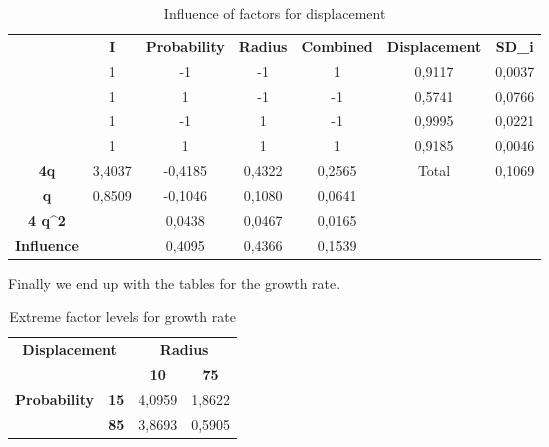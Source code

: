 \begin{table}[H]\label{tab:InflDisp}
\centering
\begin{tabular}{c|c|c|c|c|cc}
\cline{2-7}
 & \textbf{I} & \textbf{Probability} & \textbf{Radius} & \textbf{Combined} & \multicolumn{1}{c|}{\textbf{Displacement}} & \multicolumn{1}{c|}{\textbf{SD\_i}} \\ \cline{2-7} 
 & 1 & -1 & -1 & 1 & \multicolumn{1}{c|}{0,9117} & \multicolumn{1}{c|}{0,0037} \\ \cline{2-7} 
 & 1 & 1 & -1 & -1 & \multicolumn{1}{c|}{0,5741} & \multicolumn{1}{c|}{0,0766} \\ \cline{2-7} 
 & 1 & -1 & 1 & -1 & \multicolumn{1}{c|}{0,9995} & \multicolumn{1}{c|}{0,0221} \\ \cline{2-7} 
 & 1 & 1 & 1 & 1 & \multicolumn{1}{c|}{0,9185} & \multicolumn{1}{c|}{0,0046} \\ \hline
\multicolumn{1}{|c|}{\textbf{4q}} & 3,4037 & -0,4185 & 0,4322 & 0,2565 & \multicolumn{1}{c|}{Total} & \multicolumn{1}{c|}{0,1069} \\ \hline
\multicolumn{1}{|c|}{\textbf{q}} & 0,8509 & -0,1046 & 0,1080 & 0,0641 &  &  \\ \cline{1-5}
\multicolumn{1}{|c|}{\textbf{4 q\textasciicircum{}2}} &  & 0,0438 & 0,0467 & 0,0165 &  &  \\ \cline{1-5}
\multicolumn{1}{|c|}{\textbf{Influence}} &  & 0,4095 & 0,4366 & 0,1539 &  &  \\ \cline{1-5}
\end{tabular}
\caption{Influence of factors for displacement}
\end{table}


Finally we end up with the tables for the growth rate.


\begin{table}[H]
\centering
\begin{tabular}{|cc|cc|}
\hline
\multicolumn{2}{|c|}{\multirow{2}{*}{\textbf{Displacement}}} & \multicolumn{2}{c|}{\textbf{Radius}} \\ \cline{3-4} 
\multicolumn{2}{|c|}{} & \multicolumn{1}{c|}{\textbf{10}} & \textbf{75} \\ \hline
\multicolumn{1}{|c|}{\multirow{2}{*}{\textbf{Probability}}} & \textbf{15} & \multicolumn{1}{c|}{4,0959} & 1,8622 \\ \cline{2-4} 
\multicolumn{1}{|c|}{} & \textbf{85} & \multicolumn{1}{c|}{3,8693} & 0,5905 \\ \hline
\end{tabular}
\caption{Extreme factor levels for growth rate}
\end{table}

